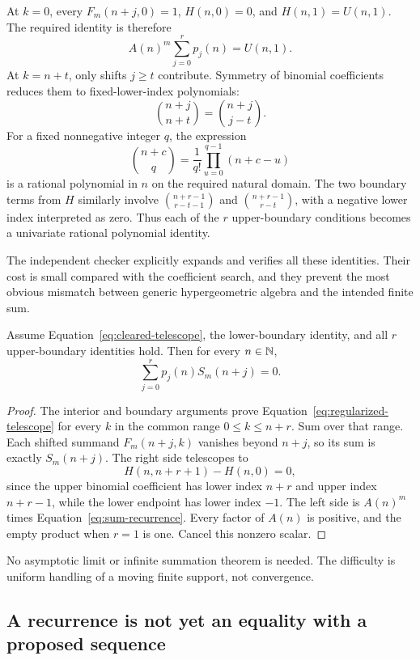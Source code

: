 At $k=0$, every $F_m(n+j,0)=1$, $H(n,0)=0$, and $H(n,1)=U(n,1)$. The required
identity is therefore
\begin{equation}
 A(n)^m\sum_{j=0}^{r}p_j(n)=U(n,1).
 \label{eq:lower-boundary}
\end{equation}
At $k=n+t$, only shifts $j\ge t$ contribute. Symmetry of binomial coefficients
reduces them to fixed-lower-index polynomials:
\[
 \binom{n+j}{n+t}=\binom{n+j}{j-t}.
\]
For a fixed nonnegative integer $q$, the expression
\[
 \binom{n+c}{q}=\frac{1}{q!}\prod_{u=0}^{q-1}(n+c-u)
\]
is a rational polynomial in $n$ on the required natural domain. The two
boundary terms from $H$ similarly involve
$\binom{n+r-1}{r-t-1}$ and $\binom{n+r-1}{r-t}$, with a negative lower index
interpreted as zero. Thus each of the $r$ upper-boundary conditions becomes a
univariate rational polynomial identity.

The independent checker explicitly expands and verifies all these identities.
Their cost is small compared with the coefficient search, and they prevent the
most obvious mismatch between generic hypergeometric algebra and the intended
finite sum.

\begin{theorem}
Assume Equation~\eqref{eq:cleared-telescope}, the lower-boundary identity, and all
$r$ upper-boundary identities hold. Then for every $n\in\mathbb{N}$,
\begin{equation}
 \sum_{j=0}^{r}p_j(n)S_m(n+j)=0.
 \label{eq:sum-recurrence}
\end{equation}
\end{theorem}
\begin{proof}
The interior and boundary arguments prove Equation~\eqref{eq:regularized-telescope}
for every $k$ in the common range $0\le k\le n+r$. Sum over that range. Each
shifted summand $F_m(n+j,k)$ vanishes beyond $n+j$, so its sum is exactly
$S_m(n+j)$. The right side telescopes to
\[
 H(n,n+r+1)-H(n,0)=0,
\]
since the upper binomial coefficient has lower index $n+r$ and upper index
$n+r-1$, while the lower endpoint has lower index $-1$. The left side is
$A(n)^m$ times Equation~\eqref{eq:sum-recurrence}. Every factor of $A(n)$ is
positive, and the empty product when $r=1$ is one. Cancel this nonzero scalar.
\end{proof}

No asymptotic limit or infinite summation theorem is needed. The difficulty is
uniform handling of a moving finite support, not convergence.

\subsection{A recurrence is not yet an equality with a proposed sequence}


